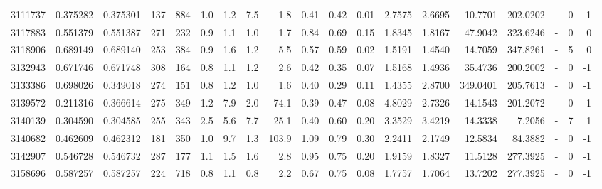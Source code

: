 \begin{tabular}{rrrrrrrrrrrrrrrrlrr}
   3111737 & 0.375282 &   0.375301 &  137 &  884 &      1.0 &      1.2 &     7.5 &      1.8 &       0.41 &        0.42 &        0.01 &  2.7575 &  2.6695 &   10.7701 &  202.0202 &             - &        0 &         -1 \\
   3117883 & 0.551379 &   0.551387 &  271 &  232 &      0.9 &      1.1 &     1.0 &      1.7 &       0.84 &        0.69 &        0.15 &  1.8345 &  1.8167 &   47.9042 &  323.6246 &             - &        0 &          0 \\
   3118906 & 0.689149 &   0.689140 &  253 &  384 &      0.9 &      1.6 &     1.2 &      5.5 &       0.57 &        0.59 &        0.02 &  1.5191 &  1.4540 &   14.7059 &  347.8261 &             - &        5 &          0 \\
   3132943 & 0.671746 &   0.671748 &  308 &  164 &      0.8 &      1.1 &     1.2 &      2.6 &       0.42 &        0.35 &        0.07 &  1.5168 &  1.4936 &   35.4736 &  200.2002 &             - &        0 &         -1 \\
   3133386 & 0.698026 &   0.349018 &  274 &  151 &      0.8 &      1.2 &     1.0 &      1.6 &       0.40 &        0.29 &        0.11 &  1.4355 &  2.8700 &  349.0401 &  205.7613 &             - &        0 &         -1 \\
   3139572 & 0.211316 &   0.366614 &  275 &  349 &      1.2 &      7.9 &     2.0 &     74.1 &       0.39 &        0.47 &        0.08 &  4.8029 &  2.7326 &   14.1543 &  201.2072 &             - &        0 &         -1 \\
   3140139 & 0.304590 &   0.304585 &  255 &  343 &      2.5 &      5.6 &     7.7 &     25.1 &       0.40 &        0.60 &        0.20 &  3.3529 &  3.4219 &   14.3338 &    7.2056 &             - &        7 &          1 \\
   3140682 & 0.462609 &   0.462312 &  181 &  350 &      1.0 &      9.7 &     1.3 &    103.9 &       1.09 &        0.79 &        0.30 &  2.2411 &  2.1749 &   12.5834 &   84.3882 &             - &        0 &         -1 \\
   3142907 & 0.546728 &   0.546732 &  287 &  177 &      1.1 &      1.5 &     1.6 &      2.8 &       0.95 &        0.75 &        0.20 &  1.9159 &  1.8327 &   11.5128 &  277.3925 &             - &        0 &         -1 \\
   3158696 & 0.587257 &   0.587257 &  224 &  718 &      0.8 &      1.1 &     0.8 &      2.2 &       0.67 &        0.75 &        0.08 &  1.7757 &  1.7064 &   13.7202 &  277.3925 &             - &        0 &         -1 \\

\end{tabular}
